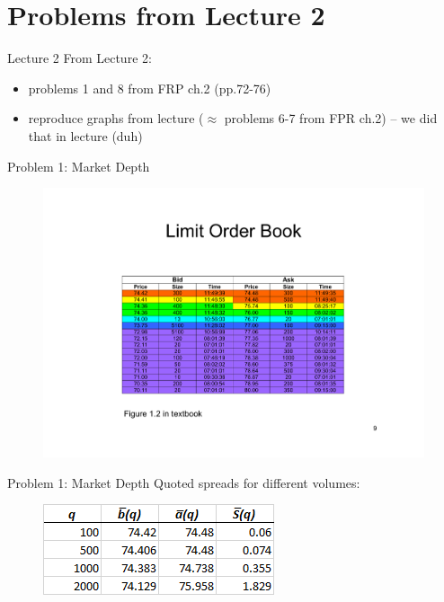 \documentclass[english,10pt
,aspectratio=169
]{beamer}
\begin{document}
\section{Problems from Lecture 2}

\begin{frame}{Lecture 2}
From Lecture 2: 
\begin{itemize}
	\item problems 1 and 8 from FRP ch.2 (pp.72-76)
	\item reproduce graphs from lecture ($\approx$ problems 6-7 from FPR ch.2) -- we did that in lecture (duh)
\end{itemize}
\end{frame}


\begin{frame}{Problem 1: Market Depth}
\begin{figure}
	\includegraphics[width=.7\paperwidth]{pics/Image_LOB}
\end{figure}
\end{frame}


\begin{frame}{Problem 1: Market Depth}
	Quoted spreads for different volumes:
	\begin{figure}
		\includegraphics[width=.5\paperwidth]{pics/ch2ex1}
	\end{figure}
	
\end{frame}
\end{document}
